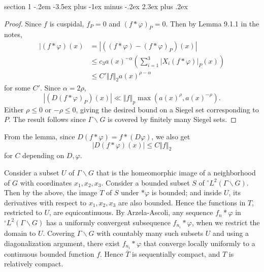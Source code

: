 \documentclass[12pt]{article}
\makeatletter
\theoremstyle{norm}
\newcommand{\N}[0]{\mathbb{N}}
\newcommand{\al}[0]{\alpha}
\newcommand{\Ga}[0]{\Gamma}
\newcommand{\ph}[0]{\varphi}
\newcommand{\rh}[0]{\rho}
\newcommand{\pa}[1]{\left( {#1} \right)}
\newcommand{\ve}[1]{\left\Vert{#1}\right\Vert}
\newcommand{\bs}[0]{\backslash}
\newcommand{\ol}[1]{\overline{#1}}
\newenvironment{problem}{\@startsection
       {section}
       {1}
       {-.2em}
       {-3.5ex plus -1ex minus -.2ex}
       {2.3ex plus .2ex}
       {\pagebreak[3]%
       \large\bf\noindent{Problem }
       }
       }
       {
       }
\makeatother
\begin{document}
\begin{problem}{\it }
\begin{proof}
Since $f$ is cuspidal, $f_P=0$ and $(f*\ph)_P=0$. 
Then by Lemma 9.1.1 in the notes,
\begin{align*}
|(f*\ph)(x)&=
|((f*\ph)-(f*\ph)_P)(x)|\\
&\le c_3 a(x)^{-\al}\pa{\sum_{i=1}^3 |X_i(f*\ph)|_P(x)}\\
&\le C'\ve{f}_2 a(x)^{\rh-\al}
\end{align*}
for some $C'$. Since $\al=2\rh$, %
\[
|(D(f*\ph)_P)(x)|\ll \ve{f}_p \max(a(x)^{\rh},a(x)^{-\rh}).
\]
Either $\rh\le 0$ or $-\rh\le 0$, giving the desired bound on a Siegel set corresponding to $P$. The result follows since $\Ga\bs G$ is covered by finitely many Siegel sets.
\end{proof}
From the lemma, since $D(f*\ph)=f*(D\ph)$, we also get
\[
|D(f*\ph)(x)|\le C\ve{f}_2
\]
for $C$ depending on $D,\ph$.

Consider a subset $U$ of $\Ga\bs G$ that is the homeomorphic image of a neighborhood of $G$ with coordinates $x_1,x_2,x_3$. 
Consider a bounded subset $S$ of ${}^{\circ}L^2(\Ga\bs G)$. Then by the above, the image $T$ of $S$ under $*\ph$ is bounded; and inside $U$, its derivatives with respect to $x_1,x_2,x_3$ are also bounded. Hence the functions in $T$, restricted to $U$, are equicontinuous.
By Arzela-Ascoli, any sequence $f_n*\ph$ in ${}^{\circ}L^2(\Ga\bs G)$ has a uniformly convergent subsequence $f_{n_i}*\ph$, when we restrict the domain to $U$.
Covering $\Ga\bs G$ with countably many such subsets $U$ and using a diagonalization argument, there exist $f_{n_i}*\ph$ that converge locally uniformly to a continuous bounded function $f$. Hence $\ol{T}$ is sequentially compact, and $T$ is relatively compact.
\end{problem}
\end{document}
